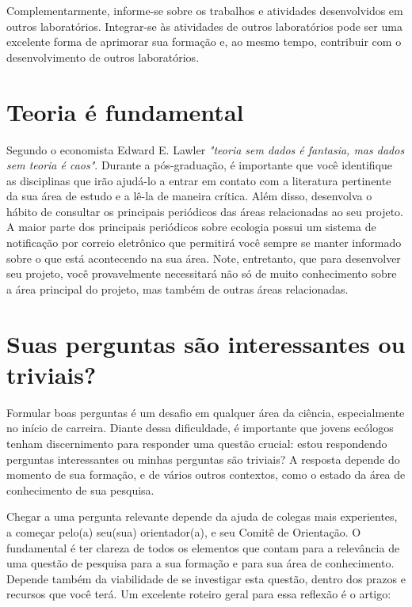 Complementarmente, informe-se sobre os trabalhos e atividades
desenvolvidos em outros laboratórios. Integrar-se às atividades de
outros laboratórios pode ser uma excelente forma de aprimorar sua
formação e, ao mesmo tempo, contribuir com o desenvolvimento de outros
laboratórios.

\section{Teoria é fundamental}

Segundo o economista Edward E. Lawler \emph{"teoria sem dados é
  fantasia, mas dados sem teoria é caos"}. Durante a pós-graduação, é
importante que você identifique as disciplinas que irão ajudá-lo a
entrar em contato com a literatura pertinente da sua área de estudo e
a lê-la de maneira crítica. Além disso, desenvolva o hábito de
consultar os principais periódicos das áreas relacionadas ao seu
projeto. A maior parte dos principais periódicos sobre ecologia possui
um sistema de notificação por correio eletrônico que permitirá você
sempre se manter informado sobre o que está acontecendo na sua
área. Note, entretanto, que para desenvolver seu projeto, você
provavelmente necessitará não só de muito conhecimento sobre a área
principal do projeto, mas também de outras áreas relacionadas.

\section{Suas perguntas são interessantes ou triviais?}

Formular boas perguntas é um desafio em qualquer área da ciência,
especialmente no início de carreira. Diante dessa
dificuldade, é importante que jovens ecólogos tenham discernimento
para responder uma questão crucial: estou respondendo perguntas
interessantes ou minhas perguntas são triviais? A resposta depende do
momento de sua formação, e de vários outros contextos, como o estado
da área de conhecimento de sua pesquisa.

Chegar a uma pergunta relevante depende da ajuda de colegas mais
experientes, a começar pelo(a) seu(sua) orientador(a), e seu Comitê de
Orientação. O fundamental é ter clareza de todos os elementos que
contam para a relevância de uma questão de pesquisa para a sua
formação e para sua área de conhecimento.  Depende também da
viabilidade de se investigar esta questão, dentro dos prazos e
recursos que você terá.  Um excelente roteiro geral para essa reflexão
é o artigo:

